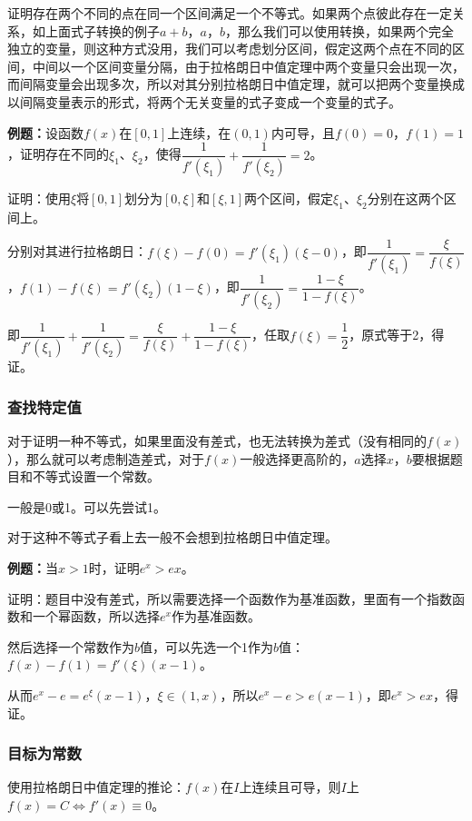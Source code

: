 \documentclass[UTF8, 12pt]{ctexart}
\begin{document}
证明存在两个不同的点在同一个区间满足一个不等式。如果两个点彼此存在一定关系，如上面式子转换的例子$a+b$，$a$，$b$，那么我们可以使用转换，如果两个完全独立的变量，则这种方式没用，我们可以考虑划分区间，假定这两个点在不同的区间，中间以一个区间变量分隔，由于拉格朗日中值定理中两个变量只会出现一次，而间隔变量会出现多次，所以对其分别拉格朗日中值定理，就可以把两个变量换成以间隔变量表示的形式，将两个无关变量的式子变成一个变量的式子。

\textbf{例题：}设函数$f(x)$在$[0,1]$上连续，在$(0,1)$内可导，且$f(0)=0$，$f(1)=1$，证明存在不同的$\xi_1$、$\xi_2$，使得$\dfrac{1}{f'(\xi_1)}+\dfrac{1}{f'(\xi_2)}=2$。

证明：使用$\xi$将$[0,1]$划分为$[0,\xi]$和$[\xi,1]$两个区间，假定$\xi_1$、$\xi_2$分别在这两个区间上。

分别对其进行拉格朗日：$f(\xi)-f(0)=f'(\xi_1)(\xi-0)$，即$\dfrac{1}{f'(\xi_1)}=\dfrac{\xi}{f(\xi)}$，$f(1)-f(\xi)=f'(\xi_2)(1-\xi)$，即$\dfrac{1}{f'(\xi_2)}=\dfrac{1-\xi}{1-f(\xi)}$。

即$\dfrac{1}{f'(\xi_1)}+\dfrac{1}{f'(\xi_2)}=\dfrac{\xi}{f(\xi)}+\dfrac{1-\xi}{1-f(\xi)}$，任取$f(\xi)=\dfrac{1}{2}$，原式等于2，得证。

\subsubsection{查找特定值}

对于证明一种不等式，如果里面没有差式，也无法转换为差式（没有相同的$f(x)$），那么就可以考虑制造差式，对于$f(x)$一般选择更高阶的，$a$选择$x$，$b$要根据题目和不等式设置一个常数。

一般是0或1。可以先尝试1。

对于这种不等式子看上去一般不会想到拉格朗日中值定理。

\textbf{例题：}当$x>1$时，证明$e^x>ex$。

证明：题目中没有差式，所以需要选择一个函数作为基准函数，里面有一个指数函数和一个幂函数，所以选择$e^x$作为基准函数。

然后选择一个常数作为$b$值，可以先选一个1作为$b$值：$f(x)-f(1)=f'(\xi)(x-1)$。

从而$e^x-e=e^\xi(x-1)$，$\xi\in(1,x)$，所以$e^x-e>e(x-1)$，即$e^x>ex$，得证。

\subsubsection{目标为常数}

使用拉格朗日中值定理的推论：$f(x)$在$I$上连续且可导，则$I$上$f(x)=C\Leftrightarrow f'(x)\equiv 0$。
\end{document}
